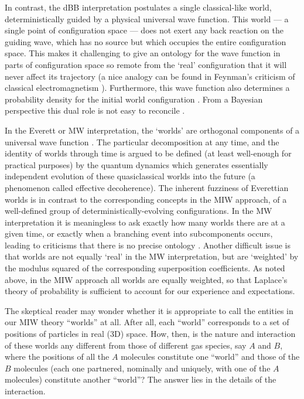 \documentclass[12pt, aps,pra,amsmath,amssymb,superscriptaddress]{revtex4-2}
\renewcommand{\(}{\left(}
\renewcommand{\)}{\right)}
\newcommand{\red}{\color{red}}
\newcommand{\blk}{\color{black}}
\renewcommand\red{\blk}
\begin{document}
In contrast, the dBB interpretation postulates a single \red classical-like \blk world, deterministically
guided by a physical \red universal \blk wave function.  This world \red --- a single
point of configuration space --- \blk does not exert any back reaction on the
guiding wave, which has no source but which occupies the entire configuration
space. This  makes it \red challenging \blk to give an ontology for the wave function in
parts of configuration space so remote from the `real' configuration that it will
never affect \red its trajectory \blk (a nice analogy can be found in Feynman's criticism of classical
electromagnetism \cite{feynman}). 
Furthermore, \blk this wave function also
determines a probability density for the initial world configuration
\cite{dbb,hollandbook}.  From a Bayesian perspective this dual role is not easy to reconcile
\cite{wiseman07}.
 
In the \blk Everett or \blk MW interpretation, the `worlds' are orthogonal
components of a universal wave function \cite{mwi}. \blk The particular
decomposition at any time, and the identity of worlds through time is argued to
be defined (at least well-enough for practical purposes) by the quantum dynamics
which generates essentially independent evolution of these quasiclassical worlds
into the future (a phenomenon called effective decoherence). The inherent
fuzziness of Everettian worlds is in contrast to the
corresponding concepts in the MIW approach, of a  well-defined group \blk of
deterministically-evolving configurations. \blk In the MW interpretation \blk it
is meaningless to ask exactly how many worlds there are at a given time, or
exactly when a branching event into subcomponents occurs, leading to criticisms
that there is no precise ontology \cite{kent}.  Another \blk difficult issue
 is that worlds are not \blk equally `real' in the MW
interpretation, but are `weighted' by the \blk modulus squared of the \blk
corresponding superposition coefficients. \blk As noted above,  in the MIW
approach all worlds are equally weighted, so that Laplace's theory of
probability is sufficient to account for our experience and expectations. \blk  
 
 \red The skeptical reader may wonder whether it is appropriate to call 
 the entities in our MIW theory ``worlds'' at all. After all, each ``world'' corresponds 
 to a set of positions of particles in real (3D) space. How, then, is the nature and 
 interaction of these worlds any different from those of different gas species, say 
 $A$ and $B$, where the positions of all the $A$ molecules
 constitute one ``world'' and those of the $B$ molecules (each one partnered, 
 nominally and uniquely, with one of the $A$ molecules) 
constitute another ``world''? The answer lies in the details of the interaction.
 
\end{document}
